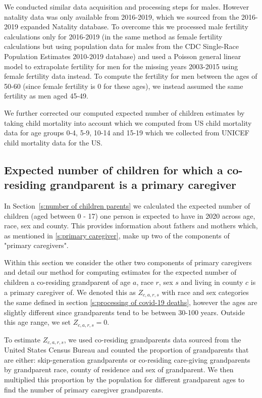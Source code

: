 \documentclass[11pt]{article}
\begin{document}
We conducted similar data acquisition and processing steps for males. However natality data was only available from 2016-2019, which we sourced from the  2016-2019 expanded Natality database. To overcome this we processed male fertility calculations only for 2016-2019 (in the same method as female fertility calculations but using population data for males from the CDC Single-Race Population Estimates 2010-2019 database) and used a Poisson general linear model to extrapolate fertility for men for the missing years 2003-2015 using female fertility data instead. To compute the fertility for men between the ages of 50-60 (since female fertility is 0 for these ages), we instead assumed the same fertility as men aged 45-49.

We further corrected our computed expected number of children estimates by taking child mortality into account which we computed from US child mortality data for age groups 0-4, 5-9, 10-14 and 15-19 which we collected from UNICEF child mortality data for the US.

\subsection{Expected number of children for which a co-residing grandparent is a primary caregiver}\label{s:number of children grandparents}

In Section~\ref{s:number of children parents} we calculated the expected number of children (aged between 0 - 17) one person is expected to have in 2020 across age, race, sex and county. This provides information about fathers and mothers which, as mentioned in \ref{s:primary caregiver}, make up two of the components of "primary caregivers". 

Within this section we consider the other two components of primary caregivers and detail our method for computing estimates for the expected number of children a co-residing grandparent of age $a$, race $r$, sex $s$ and living in county $c$ is a primary caregiver of. We denoted this as $Z_{c, a, r, s}$ with race and sex categories the same defined in section \ref{s:processing of covid-19 deaths}, however the ages are slightly different since  grandparents tend to be between 30-100 years. Outside this age range, we set $Z_{c, a, r, s} = 0$.

To estimate $Z_{c, a, r, s}$, we used co-residing grandparents data sourced from the United States Census Bureau\cite{grandparents_data} and counted the proportion of grandparents that are either: skip-generation grandparents or co-residing care-giving grandparents by grandparent race, county of residence and sex of grandparent. We then multiplied this proportion by the population for different grandparent ages to find the number of primary caregiver grandparents. 
\end{document}
